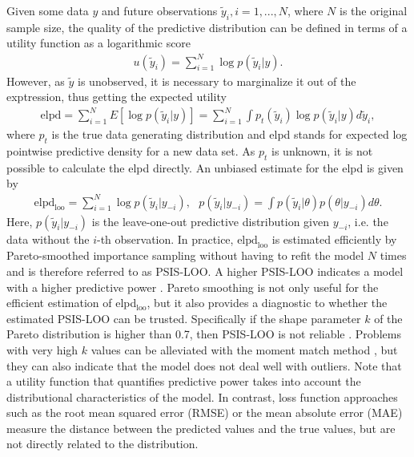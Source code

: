 Given some data $y$ and future observations $\tilde y_i, i = 1, ..., N$, where $N$ is the original sample size, the quality of the predictive distribution can be defined in terms of a utility function as a logarithmic score \citep{piironen_comparison_2017}
\begin{gather*}
    u(\tilde y_i) = \displaystyle \sum_{i = 1}^N\log p(\tilde y_i|y).
\end{gather*}
However, as $\tilde y$ is unobserved, it is necessary to marginalize it out of the exptression, thus getting the expected utility
\begin{gather*}
    \text{elpd} =
    \displaystyle \sum_{i = 1}^N E[\log p(\tilde y_i| y)] =
    \displaystyle \sum_{i = 1}^N \int p_t(\tilde y_i) \log p(\tilde y_i| y) d \tilde y_i,
\end{gather*}
where $p_t$ is the true data generating distribution and elpd stands for expected log pointwise predictive density for a new data set.
As $p_t$ is unknown, it is not possible to calculate the elpd directly.
An unbiased estimate for the elpd is given by
\begin{gather}
    \text{elpd}_{\text{loo}} =
    \displaystyle \sum_{i = 1}^N \log p(\tilde y_i| y_{-i}),
    ~~~ p(\tilde y_i| y_{-i}) = \displaystyle \int p(\tilde y_i | \theta)p(\theta|y_{-i})d\theta.
\end{gather}
Here, $p(\tilde y_i| y_{-i})$ is the leave-one-out predictive distribution given $y_{-i}$, i.e. the data without the $i$-th observation.
In practice, $\text{elpd}_{\text{loo}}$ is estimated efficiently by Pareto-smoothed importance sampling without having to refit the model $N$ times and is therefore referred to as PSIS-LOO.
A higher PSIS-LOO indicates a model with a higher predictive power \citep{vehtari_practical_2017}.
Pareto smoothing is not only useful for the efficient estimation of elpd$_{\text{loo}}$, but it also provides a diagnostic to whether the estimated PSIS-LOO can be trusted.
Specifically if the shape parameter $k$ of the Pareto distribution is higher than 0.7, then PSIS-LOO is not reliable \citep{vehtari_practical_2017}.
Problems with very high $k$ values can be alleviated with the moment match method \cite{paananen_implicitly_2021}, but they can also indicate that the model does not deal well with outliers.
Note that a utility function that quantifies predictive power takes into account the distributional characteristics of the model.
In contrast, loss function approaches such as the root mean squared error (RMSE) or the mean absolute error (MAE) measure the distance between the predicted values and the true values, but are not directly related to the distribution.

